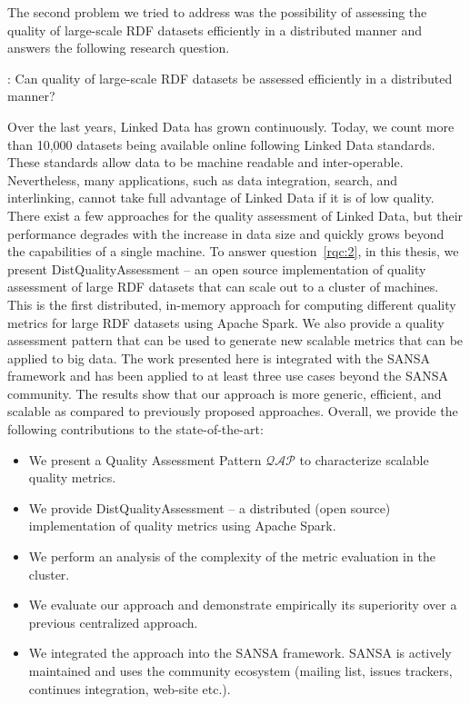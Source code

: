 The second problem we tried to address was the possibility of assessing the quality of large-scale \gls{RDF} datasets efficiently in a distributed manner and answers the following research question.

\begin{tcolorbox}
\textbf{\rqNr[RQ2]\label{rqc:2}}: Can quality of large-scale \gls{RDF} datasets be assessed efficiently in a distributed manner?
\end{tcolorbox}

Over the last years, Linked Data has grown continuously. 
Today, we count more than 10,000 datasets being available online following Linked Data standards. 
These standards allow data to be machine readable and inter-operable.  
Nevertheless, many applications, such as data integration, search, and interlinking, cannot take full advantage of Linked Data if it is of low quality.
There exist a few approaches for the quality assessment of Linked Data, but their performance degrades with the increase in data size and quickly grows beyond the capabilities of a single machine.
To answer question~\ref{rqc:2}, in this thesis, we present DistQualityAssessment -- an open source implementation of quality assessment of large \gls{RDF} datasets that can scale out to a cluster of machines.
This is the first distributed, in-memory approach for computing different quality metrics for large \gls{RDF} datasets using Apache Spark. We also provide a quality assessment pattern that can be used to generate new scalable metrics that can be applied to big data.
The work presented here is integrated with the SANSA framework and has been applied to at least three use cases beyond the SANSA community.   
The results show that our approach is more generic, efficient, and scalable as compared to previously proposed approaches.
Overall, we provide the following contributions to the state-of-the-art:
\begin{itemize}
    \item We present a Quality Assessment Pattern $\mathcal{QAP}$ to characterize scalable quality metrics.
    \item We provide DistQualityAssessment -- a distributed (open source) implementation of quality metrics using Apache Spark.
    \item We perform an analysis of the complexity of the metric evaluation in the cluster.
    \item We evaluate our approach and demonstrate empirically its superiority over a previous centralized approach.
    \item We integrated the approach into the SANSA framework.
    SANSA is actively maintained and uses the community ecosystem (mailing list, issues trackers, continues integration, web-site etc.).
\end{itemize}

